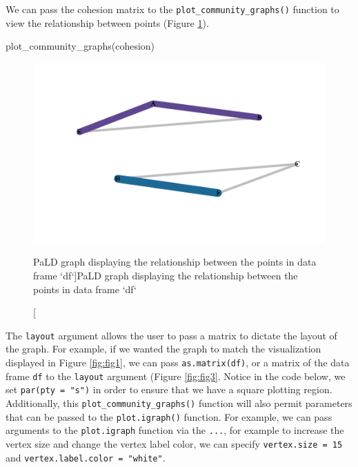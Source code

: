 We can pass the cohesion matrix to the
\texttt{plot\_community\_graphs()} function to view the relationship
between points (Figure \ref{fig:fig2}).

\begin{Schunk}
\begin{Sinput}
plot_community_graphs(cohesion)
\end{Sinput}
\begin{figure}
\includegraphics{manuscript_files/figure-latex/fig2-1} \caption[PaLD graph displaying the relationship between the points in data frame `df`]{PaLD graph displaying the relationship between the points in data frame `df`}\label{fig:fig2}
\end{figure}
\end{Schunk}

The \texttt{layout} argument allows the user to pass a matrix to dictate
the layout of the graph. For example, if we wanted the graph to match
the visualization displayed in Figure \ref{fig:fig1}, we can pass
\texttt{as.matrix(df)}, or a matrix of the data frame \texttt{df} to the
\texttt{layout} argument (Figure \ref{fig:fig3}. Notice in the code
below, we set \texttt{par(pty\ =\ "s")} in order to ensure that we have
a square plotting region. Additionally, this
\texttt{plot\_community\_graphs()} function will also permit parameters
that can be passed to the \texttt{plot.igraph()} function. For example,
we can pass arguments to the \texttt{plot.igraph} function via the
\texttt{...}, for example to increase the vertex size and change the
vertex label color, we can specify \texttt{vertex.size\ =\ 15} and
\texttt{vertex.label.color\ =\ "white"}.

